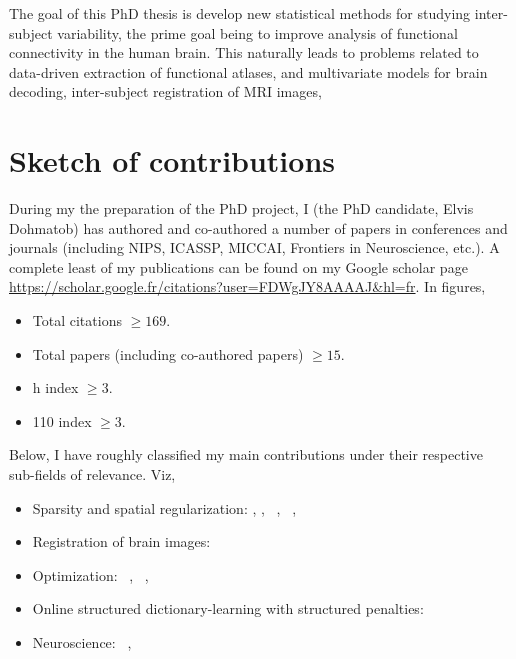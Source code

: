 The goal of this PhD thesis is develop new statistical methods for studying inter-subject variability, the prime goal being to improve analysis of functional connectivity in the human brain. This naturally leads to problems related to data-driven extraction of functional atlases, and
multivariate models for brain decoding, inter-subject registration of MRI images,

\section{Sketch of contributions}
\label{sec:contrib}
During my the preparation of the PhD project, I (the PhD
candidate, Elvis Dohmatob) has authored and co-authored a number of papers in conferences and journals (including NIPS, ICASSP, MICCAI,
Frontiers in Neuroscience, etc.).
A complete least of my publications can be found on my Google scholar page \url{https://scholar.google.fr/citations?user=FDWgJY8AAAAJ&hl=fr}. In figures,
\begin{shaded}
\begin{itemize}
\item Total citations $\ge 169$.
  \item Total papers (including co-authored papers) $\ge 15$.
  \item h index $\ge 3$.
  \item 110 index $ \ge 3$.
  \end{itemize}
\end{shaded}  
Below, I  have roughly classified my main contributions under their respective sub-fields of relevance. Viz,
\begin{shaded}
\begin{itemize}
  \item{Sparsity and spatial regularization:}
     \citep{dohmatob2014benchmarking},  \citep{dohmatob2015speeding},
     ~\citep{abrahamregion},  ~\citep{eickenberg2015total},
     ~\citep{pelle2016multivariate}
  \item{Registration of brain images:}
    ~\citep{dohmatob2016epi2epi}
  \item{Optimization:}
     ~\citep{dohmatob2015local},  ~\citep{varoquaux2015faasta},  ~\citep{dohmatob2015simple}
  \item{Online structured dictionary-learning with structured penalties:}
     ~\citep{dohmatob2016}
  \item{Neuroscience:}
     ~\citep{rahim2015integrating},  ~\citep{thirion2014fmri}
\end{itemize}
\end{shaded}

